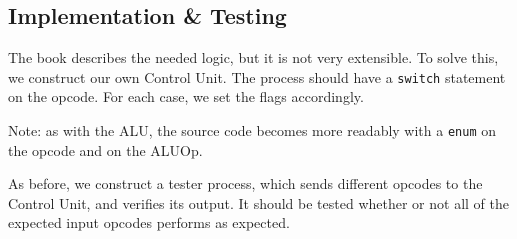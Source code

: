 \documentclass{beamer}
\begin{document}
\subsection{Implementation \& Testing}
\begin{frame}
    The book describes the needed logic, but it is not very extensible. To
    solve this, we construct our own Control Unit. The process should have a
    \texttt{switch} statement on the opcode. For each case, we set the flags
    accordingly.

    \vspace{\baselineskip}
    Note: as with the ALU, the source code becomes more readably with a
    \texttt{enum} on the opcode and on the ALUOp.

    \vspace{\baselineskip}
    As before, we construct a tester process, which sends different opcodes to
    the Control Unit, and verifies its output. It should be tested whether or
    not all of the expected input opcodes performs as expected.
\end{frame}
\end{document}
